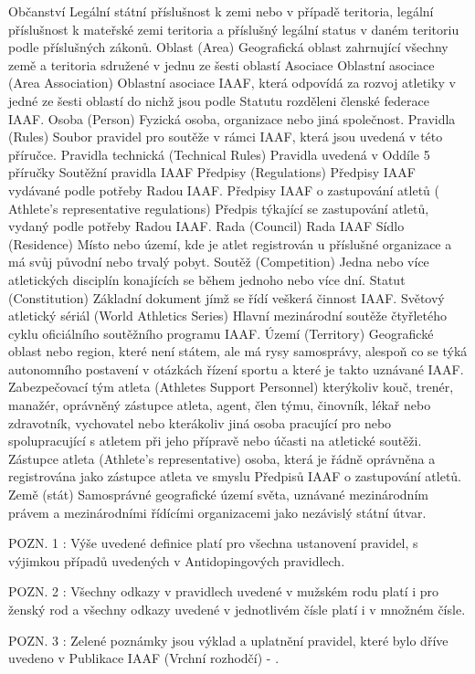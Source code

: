 \dend
\dt Občanství
\dd Legální státní příslušnost k zemi nebo v případě teritoria, legální příslušnost k mateřské zemi teritoria a příslušný legální status v daném teritoriu podle příslušných zákonů.
\dend
\dt Oblast (Area)
\dd Geografická oblast zahrnující všechny země a teritoria sdružené v jednu ze šesti oblastí Asociace
\dend
\dt Oblastní asociace (Area Association)
\dd Oblastní asociace IAAF, která odpovídá za rozvoj atletiky v jedné ze šesti oblastí do nichž jsou podle Statutu rozděleni členské federace IAAF.
\dend
\dt Osoba (Person)
\dd Fyzická osoba, organizace nebo jiná společnost.
\dend
\dt Pravidla (Rules)
\dd Soubor pravidel pro soutěže v rámci IAAF, která jsou uvedená v této příručce.
\dend
\dt Pravidla technická (Technical Rules)
\dd Pravidla uvedená v Oddíle 5 příručky Soutěžní pravidla IAAF
\dend
\dt Předpisy (Regulations)
\dd Předpisy IAAF vydávané podle potřeby Radou IAAF.
\dend
\dt Předpisy IAAF o zastupování atletů ( Athlete's representative regulations)
\dd Předpis týkající se zastupování atletů, vydaný podle potřeby Radou IAAF.
\dend
\dt Rada (Council)
\dd Rada IAAF
\dend
\dt Sídlo (Residence)
\dd Místo nebo území, kde je atlet registrován u příslušné organizace a má svůj původní nebo trvalý pobyt.
\dend
\dt Soutěž (Competition)
\dd Jedna nebo více atletických disciplín konajících se během jednoho nebo více dní.
\dend
\dt Statut (Constitution)
\dd Základní dokument jímž se řídí veškerá činnost IAAF.
\dend
\dt Světový atletický sériál (World Athletics Series)
\dd Hlavní mezinárodní soutěže čtyřletého cyklu oficiálního soutěžního programu IAAF.
\dend
\dt Území (Territory)
\dd Geografické oblast nebo region, které není státem, ale má rysy samosprávy, alespoň co se týká autonomního postavení v otázkách řízení sportu a které je takto uznávané IAAF.
\dend
\dt Zabezpečovací tým atleta (Athletes Support Personnel)
\dd kterýkoliv kouč, trenér, manažér, oprávněný zástupce atleta, agent, člen týmu, činovník, lékař nebo zdravotník, vychovatel nebo kterákoliv jiná osoba pracující pro nebo spolupracující s atletem při jeho přípravě nebo účasti na atletické soutěži.
\dend
\dt Zástupce atleta (Athlete's representative)
\dd osoba, která je řádně oprávněna a registrována jako zástupce atleta ve smyslu Předpisů IAAF o zastupování atletů.
\dend
\dt Země (stát)
\dd Samosprávné geografické území světa, uznávané mezinárodním právem a mezinárodními řídícími organizacemi jako nezávislý státní útvar.
\dend

POZN. 1 : Výše uvedené definice platí pro všechna ustanovení pravidel, s výjimkou případů uvedených v Antidopingových pravidlech.

POZN. 2 : Všechny odkazy v pravidlech uvedené v mužském rodu platí i pro ženský rod a všechny odkazy uvedené v jednotlivém čísle platí i v množném čísle.

POZN. 3 : Zelené poznámky jsou výklad a uplatnění pravidel, které bylo dříve uvedeno v Publikace IAAF  (Vrchní rozhodčí) - .



\bye